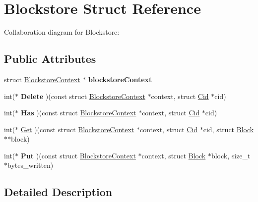 \hypertarget{struct_blockstore}{}\section{Blockstore Struct Reference}
\label{struct_blockstore}


Collaboration diagram for Blockstore\+:
\subsection*{Public Attributes}
\begin{DoxyCompactItemize}
\item 
\mbox{\label{struct_blockstore_a3af0c76f200f6eae0ba1468cd031b74b}} 
struct \mbox{\hyperlink{struct_blockstore_context}{Blockstore\+Context}} $\ast$ {\bfseries blockstore\+Context}
\item 
\mbox{\label{struct_blockstore_a941491d01404bcb2096f817dee5fc72d}} 
int($\ast$ {\bfseries Delete} )(const struct \mbox{\hyperlink{struct_blockstore_context}{Blockstore\+Context}} $\ast$context, struct \mbox{\hyperlink{struct_cid}{Cid}} $\ast$cid)
\item 
\mbox{\label{struct_blockstore_adfbcb9b463e5965aca9db997c681b964}} 
int($\ast$ {\bfseries Has} )(const struct \mbox{\hyperlink{struct_blockstore_context}{Blockstore\+Context}} $\ast$context, struct \mbox{\hyperlink{struct_cid}{Cid}} $\ast$cid)
\item 
int($\ast$ \mbox{\hyperlink{struct_blockstore_ac1e6e1a9463c75febb3bdf09e81c6497}{Get}} )(const struct \mbox{\hyperlink{struct_blockstore_context}{Blockstore\+Context}} $\ast$context, struct \mbox{\hyperlink{struct_cid}{Cid}} $\ast$cid, struct \mbox{\hyperlink{struct_block}{Block}} $\ast$$\ast$block)
\item 
\mbox{\label{struct_blockstore_a043419cb7056d2d1c2b7261952fda6b3}} 
int($\ast$ {\bfseries Put} )(const struct \mbox{\hyperlink{struct_blockstore_context}{Blockstore\+Context}} $\ast$context, struct \mbox{\hyperlink{struct_block}{Block}} $\ast$block, size\+\_\+t $\ast$bytes\+\_\+written)
\end{DoxyCompactItemize}


\subsection{Detailed Description}


